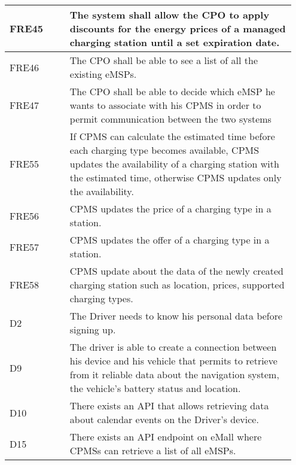 {\begin{longtable}{|p{0.20\linewidth}p{0.75\linewidth} |}
    \hline
    \rowcolor{bluepoli!15} FRE45 &The system shall allow the CPO to apply discounts for the energy prices of a managed charging station until a set expiration date.\\
    \hline
    \rowcolor{bluepoli!15}
    FRE46 & The CPO shall be able to see a list of all the existing eMSPs. \\
    \hline
    \rowcolor{bluepoli!15} FRE47 &  The CPO shall be able to decide which eMSP he wants to associate with his CPMS in order to permit communication between the two systems \\
    \hline
    \rowcolor{bluepoli!15} FRE55 & If CPMS can calculate the estimated time before each charging type becomes available, CPMS updates the availability of a charging station with the estimated time, otherwise CPMS updates only the availability. \\
    \hline
    \rowcolor{bluepoli!15} FRE56 & CPMS updates the price of a charging type in a station. \\
    \hline  
    \rowcolor{bluepoli!15} FRE57 & CPMS updates the offer of a charging type in a station. \\
    \hline  
     \rowcolor{bluepoli!15}
     FRE58 & CPMS update about the data of the newly created charging station such as location, prices, supported charging types.\\
     \hline
    
    \rowcolor{bluepoli!5} D2 & The Driver needs to know his personal data before signing up. \\
    \hline 
    \rowcolor{bluepoli!5} D9 & The driver is able to create a connection between his device and his vehicle that permits to retrieve from it reliable data about the navigation system, the vehicle’s battery status and location.\\
    \hline 
    \rowcolor{bluepoli!5} D10 & There exists an API that allows retrieving data about calendar events on the Driver’s device.\\
    \hline 
    \rowcolor{bluepoli!5} D15 & There exists an API endpoint on eMall where CPMSs can retrieve a list of all eMSPs.\\
    \hline 
\end{longtable}}
